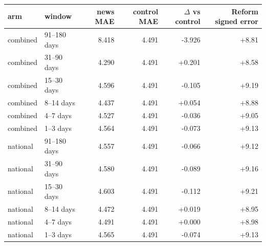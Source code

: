 \begin{tabular}{llrrrr}
\toprule
arm & window & news MAE & control MAE & $\Delta$ vs control & Reform signed error \\
\midrule
combined & 91--180 days & 8.418 & 4.491 & -3.926 & +8.81 \\
combined & 31--90 days & 4.290 & 4.491 & +0.201 & +8.58 \\
combined & 15--30 days & 4.596 & 4.491 & -0.105 & +9.19 \\
combined & 8--14 days & 4.437 & 4.491 & +0.054 & +8.88 \\
combined & 4--7 days & 4.527 & 4.491 & -0.036 & +9.05 \\
combined & 1--3 days & 4.564 & 4.491 & -0.073 & +9.13 \\
national & 91--180 days & 4.557 & 4.491 & -0.066 & +9.12 \\
national & 31--90 days & 4.580 & 4.491 & -0.089 & +9.16 \\
national & 15--30 days & 4.603 & 4.491 & -0.112 & +9.21 \\
national & 8--14 days & 4.472 & 4.491 & +0.019 & +8.95 \\
national & 4--7 days & 4.491 & 4.491 & +0.000 & +8.98 \\
national & 1--3 days & 4.565 & 4.491 & -0.074 & +9.13 \\
\bottomrule
\end{tabular}
